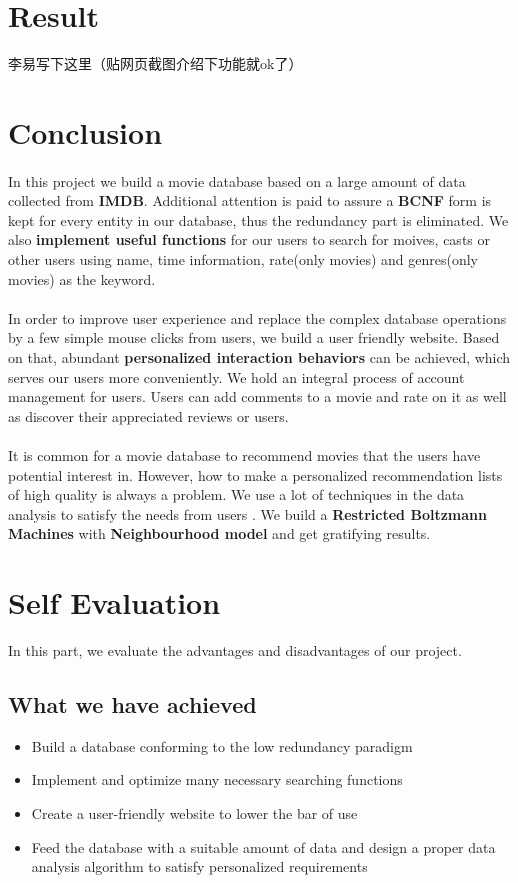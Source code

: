 \begin{CJK*}{UTF8}{gbsn}
\section{Result}
李易写下这里（贴网页截图介绍下功能就ok了）

\section{Conclusion}
\paragraph{} In this project we build a movie database based on a large amount of data collected from \textbf{IMDB}. Additional attention is paid to assure a \textbf{BCNF} form is kept for every entity in our database, thus the redundancy part is eliminated. We also \textbf{implement useful functions} for our users to search for moives, casts or other users using name,  time information, rate(only movies) and genres(only movies) as the keyword.
\paragraph{} In order to improve user experience and replace the complex database operations by a few simple mouse clicks from users, we build a user friendly website. Based on that, abundant \textbf{personalized interaction behaviors} can be achieved, which serves our users more conveniently. We hold an integral process of account management for users. Users can add comments to a movie and rate on it as well as discover their appreciated reviews or users.
\paragraph{} It is common for a movie database to recommend movies that the users have potential interest in. However,  how to make a personalized recommendation lists of high quality is always a problem. We use a lot of techniques in the data analysis to satisfy the needs from users . We build a \textbf{Restricted Boltzmann Machines}  with \textbf{Neighbourhood model} and get gratifying results.
\section{Self Evaluation}
In this part, we evaluate the advantages and disadvantages of our project.
\subsection{What we have achieved}
\begin{itemize}
\item Build a database conforming to the low redundancy paradigm
\item Implement and optimize many necessary  searching functions
\item Create a user-friendly website to lower the bar of use
\item Feed the database with a suitable amount of data and design a proper data analysis algorithm to satisfy personalized requirements
\end{itemize}

\end{CJK*}
